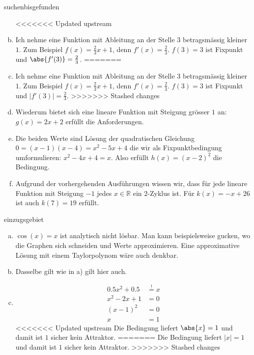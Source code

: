 \documentclass[%
<<<<<<< Updated upstream
<<<<<<< Updated upstream
11pt,%
twoside,%
titlepage,%
german,%
headsepline%
]{scrartcl}
\begin{document}
\begin{lsg}{suchenbisgefunden}	
\begin{enumerate}[a)]
<<<<<<< Updated upstream
\item Ich nehme eine Funktion mit Ableitung an der Stelle $3$ betragsmässig kleiner $1$. Zum Beispiel $f(x)=\frac{2}{3}x+1$, denn $f'(x)=\frac{2}{3}$. $f(3)=3$ ist Fixpunkt und $\abs{f'(3)}=\frac{2}{3}$.
=======
\item Ich nehme eine Funktion mit Ableitung an der Stelle $3$ betragsmässig kleiner $1$. Zum Beispiel $f(x)=\frac{2}{3}x+1$, denn $f'(x)=\frac{2}{3}$. $f(3)=3$ ist Fixpunkt und $|f'(3)|=\frac{2}{3}$.
>>>>>>> Stashed changes
\item Wiederum bietet sich eine lineare Funktion mit Steigung grösser $1$ an: $g(x)=2x+2$ erfüllt die Anforderungen.
\item Die beiden Werte sind Lösung der quadratischen Gleichung $0=(x-1)(x-4)=x^2-5x+4$ die wir als Fixpunktbedingung umformulieren: $x^2-4x+4=x$. Also erfüllt $h(x)=(x-2)^2$ die Bedingung.
\item Aufgrund der vorhergehenden Ausführungen wissen wir, dass für jede lineare Funktion mit Steigung $-1$ jedes $x\in\mathbb{R}$ ein $2$-Zyklus ist. Für $k(x)=-x+26$ ist auch $k(7)=19$ erfüllt.
\end{enumerate}
\end{lsg}
\begin{lsg}{einzugsgebiet}
    \begin{enumerate}[a)]
        \item $\cos(x)=x$ ist analytisch nicht lösbar. Man kann beispielsweise gucken, wo die Graphen sich schneiden und Werte approximieren. Eine approximative Lösung mit einem Taylorpolynom wäre auch denkbar.
        \item Dasselbe gilt wie in a) gilt hier auch.
        \item \begin{align*}
            0.5x^2+0.5 &\stackrel{!}{=} x\\
            x^2-2x+1 &= 0\\
            (x-1)^2 &= 0\\
            x &= 1
        \end{align*}
<<<<<<< Updated upstream
        Die Bedingung liefert $\abs{x}=1$ und damit ist $1$ sicher kein Attraktor.
=======
        Die Bedingung liefert $|x|=1$ und damit ist $1$ sicher kein Attraktor.
>>>>>>> Stashed changes
    \end{enumerate}
\end{lsg}
\end{document}
